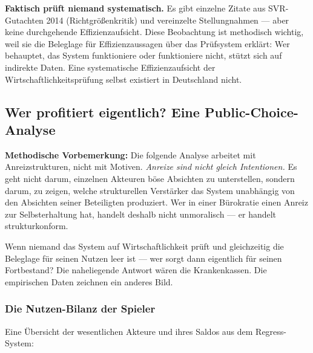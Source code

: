 \documentclass{umbruch-position}
\begin{document}
\textbf{Faktisch prüft niemand systematisch.} Es gibt einzelne Zitate aus SVR-Gutachten 2014 (Richtgrößenkritik) und vereinzelte Stellungnahmen --- aber keine durchgehende Effizienz\-aufsicht. Diese Beobachtung ist methodisch wichtig, weil sie die Beleglage für Effizienzaussagen über das Prüfsystem erklärt: Wer behauptet, das System funktioniere oder funktioniere nicht, stützt sich auf indirekte Daten. Eine systematische Effizienzaufsicht der Wirtschaftlichkeitsprüfung selbst existiert in Deutschland nicht.

\subsection{Wer profitiert eigentlich? Eine Public-Choice-Analyse}

\textbf{Methodische Vorbemerkung:} Die folgende Analyse arbeitet mit Anreizstrukturen, nicht mit Motiven. \textit{Anreize sind nicht gleich Intentionen.} Es geht nicht darum, einzelnen Akteuren böse Absichten zu unterstellen, sondern darum, zu zeigen, welche strukturellen Verstärker das System unabhängig von den Absichten seiner Beteiligten produziert. Wer in einer Bürokratie einen Anreiz zur Selbsterhaltung hat, handelt deshalb nicht unmoralisch — er handelt strukturkonform.

Wenn niemand das System auf Wirtschaftlichkeit prüft und gleichzeitig die Beleglage für seinen Nutzen leer ist — wer sorgt dann eigentlich für seinen Fortbestand? Die naheliegende Antwort wären die Krankenkassen. Die empirischen Daten zeichnen ein anderes Bild.

\subsubsection{Die Nutzen-Bilanz der Spieler}

Eine Übersicht der wesentlichen Akteure und ihres Saldos aus dem Regress-System:
\end{document}
